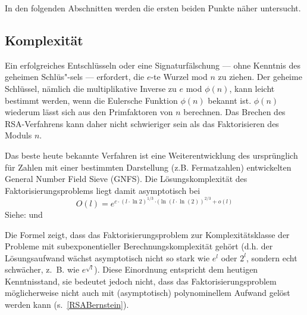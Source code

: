 \begin{refsegment}
In den folgenden Abschnitten werden die ersten beiden Punkte näher untersucht.


\subsection{Komplexität}\label{complexity}

\begin{sloppypar}
  Ein erfolgreiches Entschlüsseln oder eine Signaturfälschung --- ohne
  Kenntnis des geheimen Schlüs"-sels --- erfordert, die $e$-te Wurzel mod
  $n$ zu ziehen.  Der geheime Schlüssel, nämlich die multiplikative
  Inverse zu $e$ mod $\phi(n)$, kann leicht bestimmt werden, wenn die
  Eulersche Funktion $\phi(n)$ bekannt ist. $\phi(n)$ wiederum lässt sich aus
  den Primfaktoren von $n$ berechnen.  Das Brechen des RSA-Verfahrens kann
  daher nicht schwieriger sein als das Faktorisieren des Moduls $n$.
\end{sloppypar}
Das beste heute bekannte Verfahren ist eine Weiterentwicklung des ursprünglich für Zahlen mit einer bestimmten
Darstellung (z.B. Fermatzahlen) entwickelten General Number Field Sieve (GNFS). 
Die Lösungskomplexität des Faktorisierungsproblems liegt damit asymptotisch bei
$$
O(l) = e^{c \cdot (l \cdot \ln 2)^{1/3} \cdot  (\ln(l \cdot \ln(2))^{2/3} + o(l)}
$$
\indent Siehe: \cite{Lenstra1993} und \cite{Silverman2000}



Die Formel zeigt, dass das Faktorisierungsproblem zur
Komplexitätsklasse der
Probleme mit subexponentieller
Berechnungskomplexität gehört (d.h. der Lösungsaufwand wächst
asymptotisch nicht so stark wie $e^l$ oder $2^l$, sondern echt schwächer,
z.~B. wie $e^{\sqrt{l}}$). Diese Einordnung entspricht dem heutigen Kenntnisstand, sie bedeutet
jedoch nicht, dass das Faktorisierungsproblem möglicherweise nicht auch
mit (asymptotisch)
polynominellem Aufwand gelöst werden kann (s.~\ref{RSABernstein}).


\end{refsegment}
